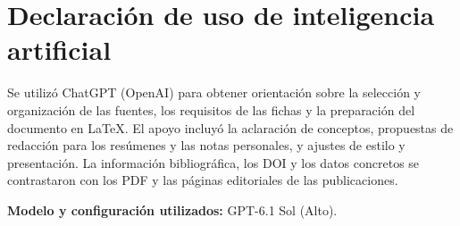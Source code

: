 \documentclass[11pt,a4paper]{article}
\begin{document}
\clearpage

\section*{Declaración de uso de inteligencia artificial}

Se utilizó ChatGPT (OpenAI) para obtener orientación sobre la selección y
organización de las fuentes, los requisitos de las fichas y la preparación
del documento en LaTeX. El apoyo incluyó la aclaración de conceptos,
propuestas de redacción para los resúmenes y las notas personales, y ajustes
de estilo y presentación. La información bibliográfica, los DOI y los datos
concretos se contrastaron con los PDF y las páginas editoriales de las
publicaciones.

\textbf{Modelo y configuración utilizados:} GPT-6.1 Sol (Alto).

\printbibliography[
    heading=bibliography,
    title={Referencias}
]
\end{document}
